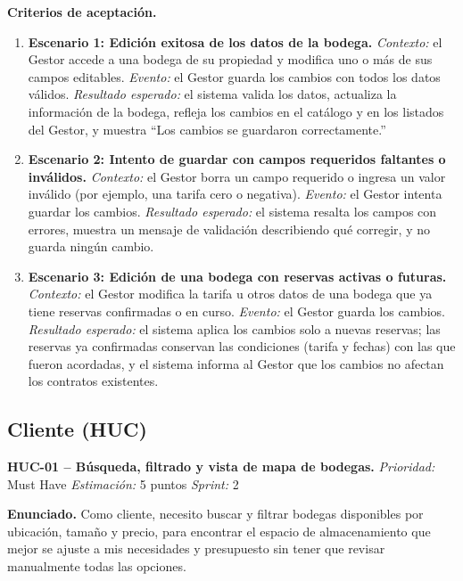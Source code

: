 \textbf{Criterios de aceptación.}
\begin{enumerate}
\item \textbf{Escenario 1: Edición exitosa de los datos de la bodega.} \textit{Contexto:} el Gestor accede a una bodega de su propiedad y modifica uno o más de sus campos editables. \textit{Evento:} el Gestor guarda los cambios con todos los datos válidos. \textit{Resultado esperado:} el sistema valida los datos, actualiza la información de la bodega, refleja los cambios en el catálogo y en los listados del Gestor, y muestra ``Los cambios se guardaron correctamente.''
\item \textbf{Escenario 2: Intento de guardar con campos requeridos faltantes o inválidos.} \textit{Contexto:} el Gestor borra un campo requerido o ingresa un valor inválido (por ejemplo, una tarifa cero o negativa). \textit{Evento:} el Gestor intenta guardar los cambios. \textit{Resultado esperado:} el sistema resalta los campos con errores, muestra un mensaje de validación describiendo qué corregir, y no guarda ningún cambio.
\item \textbf{Escenario 3: Edición de una bodega con reservas activas o futuras.} \textit{Contexto:} el Gestor modifica la tarifa u otros datos de una bodega que ya tiene reservas confirmadas o en curso. \textit{Evento:} el Gestor guarda los cambios. \textit{Resultado esperado:} el sistema aplica los cambios solo a nuevas reservas; las reservas ya confirmadas conservan las condiciones (tarifa y fechas) con las que fueron acordadas, y el sistema informa al Gestor que los cambios no afectan los contratos existentes.
\end{enumerate}

\clearpage
\subsection{Cliente (HUC)}

\textbf{HUC-01 -- Búsqueda, filtrado y vista de mapa de bodegas.} \label{req:HUC-01}
\textit{Prioridad:} Must Have \quad \textit{Estimación:} 5 puntos \quad \textit{Sprint:} 2

\textbf{Enunciado.} Como cliente, necesito buscar y filtrar bodegas disponibles por ubicación, tamaño y precio, para encontrar el espacio de almacenamiento que mejor se ajuste a mis necesidades y presupuesto sin tener que revisar manualmente todas las opciones.

